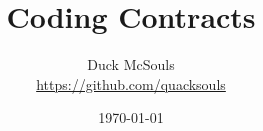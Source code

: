 \documentclass[a4paper,oneside,12pt]{article}
\begin{document}
\title{\Huge\bf Coding Contracts}
\author{%
  Duck McSouls \\
  \url{https://github.com/quacksouls}
}
\date{\today}
\maketitle
\end{document}

